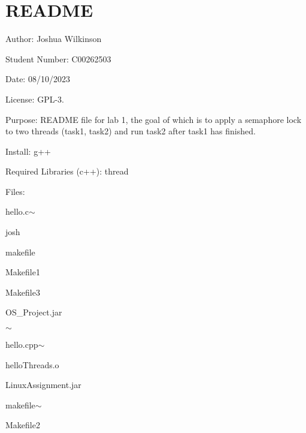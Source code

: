 \chapter{README}
\hypertarget{md__r_e_a_d_m_e}{}\label{md__r_e_a_d_m_e}
\label{md__r_e_a_d_m_e_autotoc_md0}%
%
 Author\+: Joshua Wilkinson

Student Number\+: C00262503

Date\+: 08/10/2023

License\+: GPL-\/3.

Purpose\+: README file for lab 1, the goal of which is to apply a semaphore lock to two threads (task1, task2) and run task2 after task1 has finished.

Install\+: g++

Required Libraries (c++)\+: thread

Files\+:
\begin{DoxyItemize}
\item hello.\+c\texorpdfstring{$\sim$}{\string~}
\item {}
\item josh
\item makefile
\item Makefile1
\item Makefile3
\item OS\+\_\+\+Project.\+jar
\item {}\texorpdfstring{$\sim$}{\string~}
\item {}
\item hello.\+cpp\texorpdfstring{$\sim$}{\string~}
\item hello\+Threads.\+o
\item Linux\+Assignment.\+jar
\item makefile\texorpdfstring{$\sim$}{\string~}
\item Makefile2
\item {}
\item {}
\item {} 
\end{DoxyItemize}